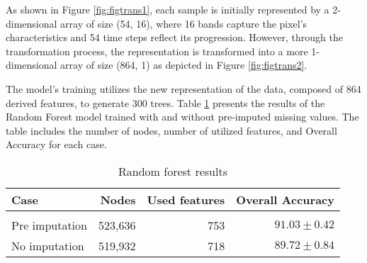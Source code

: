 As shown in Figure \ref{fig:figtrans1}, each sample is initially represented by a 2-dimensional array of size (54, 16), where 16 bands capture the pixel's characteristics and 54 time steps reflect its progression. 
However, through the transformation process, the representation is transformed into a more 1-dimensional array of size (864, 1) as depicted in Figure \ref{fig:figtrans2}. 

The model's training utilizes the new representation of the data, composed of 864 derived features, to generate 300 trees.
Table \ref{tab:rfresults} presents the results of the Random Forest model trained with and without pre-imputed missing values. 
The table includes the number of nodes, number of utilized features, and Overall Accuracy for each case.

\begin{table}[H]
  \centering
    \begin{tabular}{lrrr}
    Case                       & Nodes   & Used features & Overall Accuracy             \\[0.2cm] 
    \hline \\[-0.2cm]
    Pre imputation      & 523,636  & 753          & $91.03 \pm 0.42$\\
    No imputation  & 519,932  & 718          & $89.72 \pm 0.84$
    \end{tabular}
  \caption{Random forest results}
  \label{tab:rfresults}
\end{table}